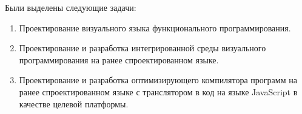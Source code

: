 Были выделены следующие задачи:

\begin{enumerate}
    \item Проектирование визуального языка функционального программирования.
    \item Проектирование и разработка интегрированной среды визуального программирования на ранее спроектированном языке.
    \item Проектирование и разработка оптимизирующего компилятора программ на ранее спроектированном языке с транслятором в код на языке JavaScript в качестве целевой платформы.
\end{enumerate}

\nocite{*}

\FloatBarrier